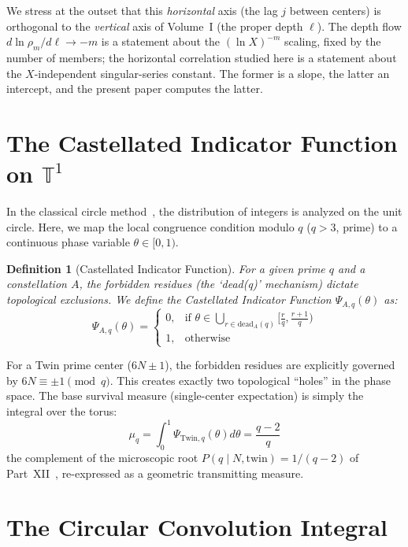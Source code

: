 \documentclass[11pt,a4paper]{article}
\newtheorem{definition}{Definition}
\begin{document}
We stress at the outset that this \emph{horizontal} axis (the lag $j$ between centers) is orthogonal to the \emph{vertical} axis of Volume~I (the proper depth $\ell$). The depth flow $d\ln\rho_m/d\ell\to-m$ is a statement about the $(\ln X)^{-m}$ scaling, fixed by the number of members; the horizontal correlation studied here is a statement about the $X$-independent singular-series constant. The former is a slope, the latter an intercept, and the present paper computes the latter.

\section{The Castellated Indicator Function on $\mathbb{T}^1$}

In the classical circle method~\cite{HL}, the distribution of integers is analyzed on the unit circle. Here, we map the local congruence condition modulo $q$ ($q>3$, prime) to a continuous phase variable $\theta \in [0, 1)$.

\begin{definition}[Castellated Indicator Function]
For a given prime $q$ and a constellation $A$, the forbidden residues (the `dead(q)' mechanism) dictate topological exclusions. We define the Castellated Indicator Function $\Psi_{A,q}(\theta)$ as:
\begin{equation}
\Psi_{A,q}(\theta) = 
\begin{cases} 
0, & \text{if } \theta \in \bigcup_{r \in \text{dead}_A(q)} [\frac{r}{q}, \frac{r+1}{q}) \\
1, & \text{otherwise}
\end{cases}
\end{equation}
\end{definition}

For a Twin prime center ($6N \pm 1$), the forbidden residues are explicitly governed by $6N \equiv \pm 1 \pmod q$. This creates exactly two topological ``holes'' in the phase space. The base survival measure (single-center expectation) is simply the integral over the torus:
\begin{equation}
\mu_q = \int_{0}^{1} \Psi_{\text{Twin},q}(\theta) d\theta = \frac{q-2}{q}
\end{equation}
the complement of the microscopic root $P(q\mid N,\text{twin})=1/(q-2)$ of
Part~XII~\cite{ChenXII}, re-expressed as a geometric transmitting measure.

\section{The Circular Convolution Integral}
\end{document}
